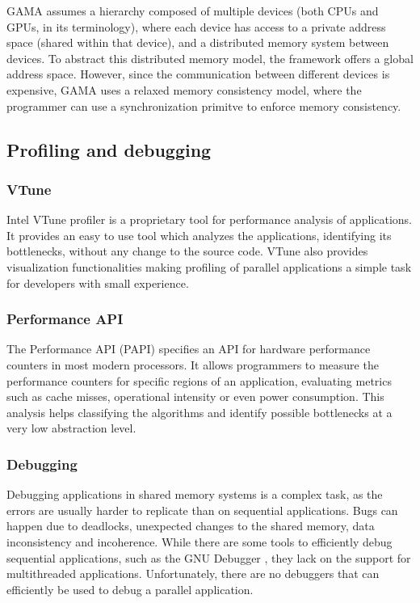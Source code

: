 GAMA assumes a hierarchy composed of multiple devices (both CPUs and GPUs, in its terminology), where each device has access to a private address space (shared within that device), and a distributed memory system between devices. To abstract this distributed memory model, the framework offers a global address space. However, since the communication between different devices is expensive, GAMA uses a relaxed memory consistency model, where the programmer can use a synchronization primitve to enforce memory consistency.

\subsection{Profiling and debugging}
\label{ProfilingDebugging}

\subsubsection*{VTune}
\label{VTune}

Intel VTune profiler \cite{Intel:VTune} is a proprietary tool for performance analysis of applications. It provides an easy to use tool which analyzes the applications, identifying its bottlenecks, without any change to the source code. VTune also provides visualization functionalities making profiling of parallel applications a simple task for developers with small experience.

\subsubsection*{Performance API}
\label{PAPI}

The Performance API (PAPI) \cite{PAPI} specifies an API for hardware performance counters in most modern processors. It allows programmers to measure the performance counters for specific regions of an application, evaluating metrics such as cache misses, operational intensity or even power consumption. This analysis helps classifying the algorithms and identify possible bottlenecks at a very low abstraction level.

\subsubsection*{Debugging}
\label{Debugging}

Debugging applications in shared memory systems is a complex task, as the errors are usually harder to replicate than on sequential applications. Bugs can happen due to deadlocks, unexpected changes to the shared memory, data inconsistency and incoherence. While there are some tools to efficiently debug sequential applications, such as the GNU Debugger \cite{GDB}, they lack on the support for multithreaded applications. Unfortunately, there are no debuggers that can efficiently be used to debug a parallel application.

